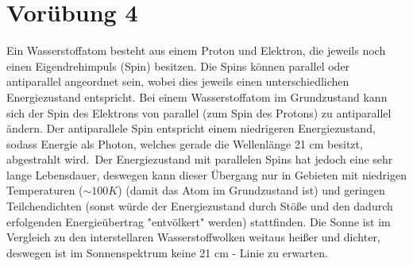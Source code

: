 \documentclass[titlepage]{scrartcl}
\begin{document}
\section{Vorübung 4}
Ein Wasserstoffatom besteht aus einem Proton und Elektron, die jeweils noch einen Eigendrehimpuls (Spin) besitzen. Die Spins können parallel oder antiparallel angeordnet sein, wobei dies jeweils einen unterschiedlichen Energiezustand entspricht. Bei einem Wasserstoffatom im Grundzustand kann sich der Spin des Elektrons von parallel (zum Spin des Protons) zu antiparallel ändern. Der antiparallele Spin entspricht einem niedrigeren Energiezustand, sodass Energie als Photon, welches gerade die Wellenlänge 21 cm besitzt, abgestrahlt wird.\
Der Energiezustand mit parallelen Spins hat jedoch eine sehr lange Lebensdauer, deswegen kann dieser Übergang nur in Gebieten mit niedrigen Temperaturen ($\sim 100K$) (damit das Atom im Grundzustand ist) und geringen Teilchendichten (sonst würde der Energiezustand durch Stöße und den dadurch erfolgenden Energieübertrag "entvölkert" werden) stattfinden. Die Sonne ist im Vergleich zu den interstellaren Wasserstoffwolken weitaus heißer und dichter, deswegen ist im Sonnenspektrum keine 21 cm - Linie zu erwarten.
\end{document}

